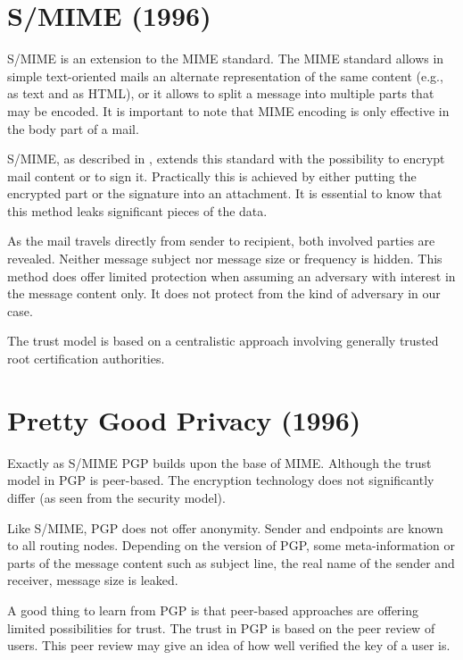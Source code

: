 \section{S/MIME (1996)}
S/MIME is an extension to the MIME standard. The MIME standard allows in simple text-oriented mails an alternate representation of the same content (e.g., as text and as HTML), or it allows to split a message into multiple parts that may be encoded. It is important to note that MIME encoding is only effective in the body part of a mail.

S/MIME, as described in \cite{RFC3851}, extends this standard with the possibility to encrypt mail content or to sign it. Practically this is achieved by either putting the encrypted part or the signature into an attachment. It is essential to know that this method leaks significant pieces of the data.

As the mail travels directly from sender to recipient, both involved parties are revealed. Neither message subject nor message size or frequency is hidden. This method does offer limited protection when assuming an adversary with interest in the message content only. It does not protect from the kind of adversary in our case. 

The trust model is based on a centralistic approach involving generally trusted root certification authorities.

\section{Pretty Good Privacy (1996)}
Exactly as S/MIME PGP\cite{rfc4880} builds upon the base of MIME. Although the trust model in PGP is peer-based. The encryption technology does not significantly differ (as seen from the security model).

Like S/MIME, PGP does not offer anonymity. Sender and endpoints are known to all routing nodes. Depending on the version of PGP, some meta-information or parts of the message content such as subject line, the real name of the sender and receiver, message size is leaked.

A good thing to learn from PGP is that peer-based approaches are offering limited possibilities for trust. The trust in PGP is based on the peer review of users. This peer review may give an idea of how well verified the key of a user is.


